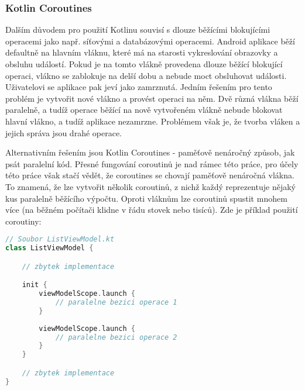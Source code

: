 \subsubsection*{Kotlin Coroutines}

\noindent Dalším důvodem pro použití Kotlinu souvisí s dlouze běžícími blokujícími operacemi jako např. síťovými a databázovými operacemi. Android aplikace běží defaultně na hlavním vláknu, které má na starosti vykreslování obrazovky a obsluhu událostí. Pokud je na tomto vlákně provedena dlouze běžící blokující operaci, vlákno se zablokuje na delší dobu a nebude moct obsluhovat události. Uživatelovi se aplikace pak jeví jako zamrznutá. Jedním řešením pro tento problém je vytvořit nové vlákno a provést operaci na něm. Dvě různá vlákna běží paralelně, a tudíž operace běžící na nově vytvořeném vlákně nebude blokovat hlavní vlákno, a tudíž aplikace nezamrzne. Problémem však je, že tvorba vláken a jejich správa jsou drahé operace. 

Alternativním řešením jsou Kotlin Coroutines - paměťově nenáročný způsob, jak psát paralelní kód. Přesné fungování coroutinů je nad rámec této práce, pro účely této práce však stačí vědět, že coroutines se chovají paměťově nenáročná vlákna. To znamená, že lze vytvořit několik coroutinů, z nichž každý reprezentuje nějaký kus paralelně běžícího výpočtu. Oproti vláknům lze coroutinů spustit mnohem více (na běžném počítači klidne v řádu stovek nebo tisíců). Zde je příklad použití coroutiny:

\newpage

\begin{lstlisting}[caption={Příklad použití coroutiny}, label={lst:coroutine-example}, tabsize=2, language=Kotlin]
// Soubor ListViewModel.kt
class ListViewModel {

	// zbytek implementace

	init {
		viewModelScope.launch {
			// paralelne bezici operace 1
		}
		
		viewModelScope.launch {
			// paralelne bezici operace 2
		}
	}

	// zbytek implementace
}
\end{lstlisting}

